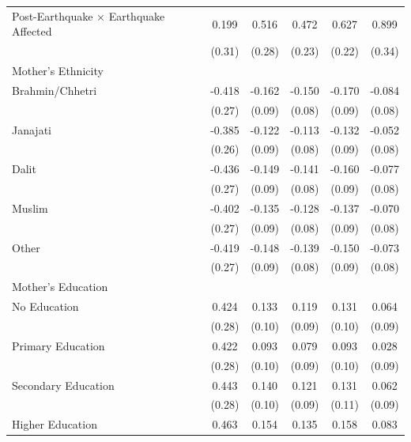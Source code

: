 \begin{longtable}{l*{5}{c}}
Post-Earthquake × Earthquake Affected & 0.199 & 0.516\sym{*} & 0.472\sym{**} & 0.627\sym{***} & 0.899\sym{***} \\
                    & (0.31) & (0.28) & (0.23) & (0.22) & (0.34) \\
\multicolumn{6}{l}{Mother's Ethnicity} \\
\hspace{1em}Brahmin/Chhetri & -0.418 & -0.162\sym{*} & -0.150\sym{*} & -0.170\sym{*} & -0.084 \\
                    & (0.27) & (0.09) & (0.08) & (0.09) & (0.08) \\
\hspace{1em}Janajati & -0.385 & -0.122 & -0.113 & -0.132 & -0.052 \\
                    & (0.26) & (0.09) & (0.08) & (0.09) & (0.08) \\
\hspace{1em}Dalit & -0.436 & -0.149 & -0.141\sym{*} & -0.160\sym{*} & -0.077 \\
                    & (0.27) & (0.09) & (0.08) & (0.09) & (0.08) \\
\hspace{1em}Muslim & -0.402 & -0.135 & -0.128\sym{*} & -0.137 & -0.070 \\
                    & (0.27) & (0.09) & (0.08) & (0.09) & (0.08) \\
\hspace{1em}Other & -0.419 & -0.148\sym{*} & -0.139\sym{*} & -0.150 & -0.073 \\
                    & (0.27) & (0.09) & (0.08) & (0.09) & (0.08) \\
\multicolumn{6}{l}{Mother's Education} \\
\hspace{1em}No Education & 0.424 & 0.133 & 0.119 & 0.131 & 0.064 \\
                    & (0.28) & (0.10) & (0.09) & (0.10) & (0.09) \\
\hspace{1em}Primary Education & 0.422 & 0.093 & 0.079 & 0.093 & 0.028 \\
                    & (0.28) & (0.10) & (0.09) & (0.10) & (0.09) \\
\hspace{1em}Secondary Education & 0.443 & 0.140 & 0.121 & 0.131 & 0.062 \\
                    & (0.28) & (0.10) & (0.09) & (0.11) & (0.09) \\
\hspace{1em}Higher Education & 0.463 & 0.154 & 0.135 & 0.158 & 0.083 \\

\end{longtable}

